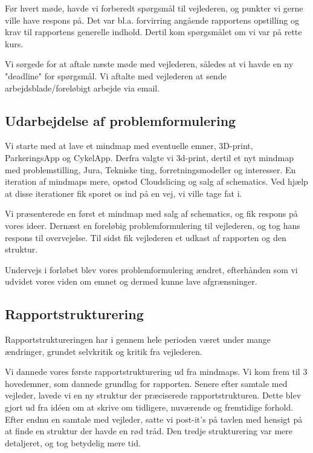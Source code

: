 Før hvert møde, havde vi forberedt spørgsmål til vejlederen, og punkter vi gerne ville have respons på. Det var bl.a. forvirring angående rapportens opstilling og krav til rapportens generelle indhold. Dertil kom spørgsmålet om vi var på rette kurs.

Vi sørgede for at aftale næste møde med vejlederen, således at vi havde en ny "deadline" for spørgsmål. Vi aftalte med vejlederen at sende arbejdsblade/foreløbigt arbejde via email.

\subsection{Udarbejdelse af problemformulering}

Vi starte med at lave et mindmap med eventuelle emner, 3D-print, ParkeringsApp og CykelApp. Derfra valgte vi 3d-print, dertil et nyt mindmap med problemstilling, Jura, Tekniske ting, forretningsmodeller og interesser. En iteration af mindmaps mere, opstod Cloudslicing og salg af schematics. Ved hjælp at disse iterationer fik sporet os ind på en vej, vi ville tage fat i.

Vi præsenterede en først et mindmap med salg af schematics, og fik respons på vores ideer. Dernæst en foreløbig problemformulering til vejlederen, og tog hans respons til overvejelse. Til sidst fik vejlederen et udkast af rapporten og den struktur.

Undervejs i forløbet blev vores problemformulering ændret, efterhånden som vi udvidet vores viden om emnet og dermed kunne lave afgrænsninger.

\subsection{Rapportstrukturering}

Rapportstruktureringen har i gennem hele perioden været under mange ændringer, grundet selvkritik og kritik fra vejlederen.

Vi dannede vores første rapportstrukturering ud fra mindmaps. Vi kom frem til 3 hovedemner, som dannede grundlag for rapporten. Senere efter samtale med vejleder, lavede vi en ny struktur der præciserede rapportstrukturen. Dette blev gjort ud fra idéen om at skrive om tidligere, nuværende og fremtidige forhold. Efter endnu en samtale med vejleder, satte vi post-it's på tavlen med hensigt på at finde en struktur der havde en rød tråd. Den tredje strukturering var mere detaljeret, og tog betydelig mere tid.

